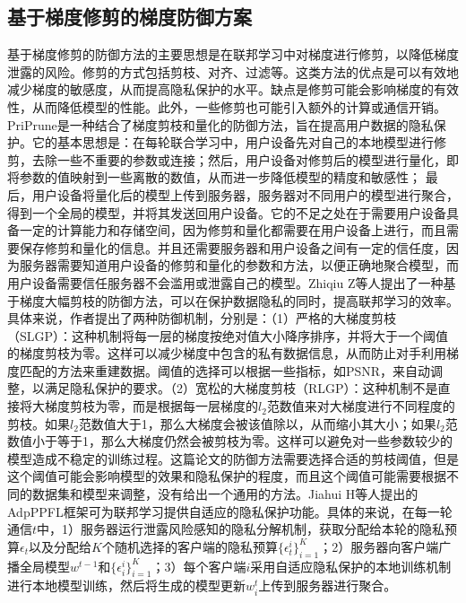\subsection{基于梯度修剪的梯度防御方案}

基于梯度修剪的防御方法的主要思想是在联邦学习中对梯度进行修剪，以降低梯度泄露的风险。修剪的方式包括剪枝、对齐、过滤等。这类方法的优点是可以有效地减少梯度的敏感度，从而提高隐私保护的水平。缺点是修剪可能会影响梯度的有效性，从而降低模型的性能。此外，一些修剪也可能引入额外的计算或通信开销。PriPrune\cite{PriPrune_Quantifying_and_Preserving_Privacy_in_Pruned_Federated_Learning}是一种结合了梯度剪枝和量化的防御方法，旨在提高用户数据的隐私保护。它的基本思想是：在每轮联合学习中，用户设备先对自己的本地模型进行修剪，去除一些不重要的参数或连接；然后，用户设备对修剪后的模型进行量化，即将参数的值映射到一些离散的数值，从而进一步降低模型的精度和敏感性； 最后，用户设备将量化后的模型上传到服务器，服务器对不同用户的模型进行聚合，得到一个全局的模型，并将其发送回用户设备。它的不足之处在于需要用户设备具备一定的计算能力和存储空间，因为修剪和量化都需要在用户设备上进行，而且需要保存修剪和量化的信息。并且还需要服务器和用户设备之间有一定的信任度，因为服务器需要知道用户设备的修剪和量化的参数和方法，以便正确地聚合模型，而用户设备需要信任服务器不会滥用或泄露自己的模型。Zhiqiu Z等人\cite{Preserving_data_privacy_in_federated_learning_through_large_gradient_pruning}提出了一种基于梯度大幅剪枝的防御方法，可以在保护数据隐私的同时，提高联邦学习的效率。具体来说，作者提出了两种防御机制，分别是：（1）严格的大梯度剪枝（SLGP）：这种机制将每一层的梯度按绝对值大小降序排序，并将大于一个阈值的梯度剪枝为零。这样可以减少梯度中包含的私有数据信息，从而防止对手利用梯度匹配的方法来重建数据。阈值的选择可以根据一些指标，如PSNR，来自动调整，以满足隐私保护的要求。（2）宽松的大梯度剪枝（RLGP）：这种机制不是直接将大梯度剪枝为零，而是根据每一层梯度的$l_2$范数值来对大梯度进行不同程度的剪枝。如果$l_2$范数值大于1，那么大梯度会被该值除以，从而缩小其大小；如果$l_2$范数值小于等于1，那么大梯度仍然会被剪枝为零。这样可以避免对一些参数较少的模型造成不稳定的训练过程。这篇论文的防御方法需要选择合适的剪枝阈值，但是这个阈值可能会影响模型的效果和隐私保护的程度，而且这个阈值可能需要根据不同的数据集和模型来调整，没有给出一个通用的方法。Jiahui H等人\cite{Shield_Against_Gradient_Leakage_Attacks_Adaptive_Privacy-Preserving_Federated_Learning}提出的AdpPPFL框架可为联邦学习提供自适应的隐私保护功能。具体的来说，在每一轮通信$t$中，1）服务器运行泄露风险感知的隐私分解机制，获取分配给本轮的隐私预算$ϵ_t$以及分配给$K$个随机选择的客户端的隐私预算$\{\epsilon_{t}^{i}\}_{i=1}^{K}$；2）服务器向客户端广播全局模型$w^{t-1}$和$\{\epsilon_{i}^{i}\}_{i=1}^{K}$；3）每个客户端$i$采用自适应隐私保护的本地训练机制进行本地模型训练，然后将生成的模型更新$w^t_i$上传到服务器进行聚合。

